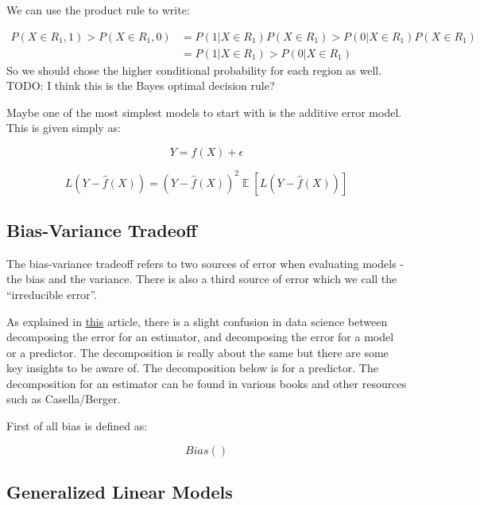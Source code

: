 \documentclass[paper=a4, fontsize=11pt]{scrartcl} %
\numberwithin{equation}{section} %
\numberwithin{figure}{section} %
\numberwithin{table}{section} %
\DeclareMathOperator{\EX}{\mathbb{E}}%
\begin{document}
 We can use the product rule to write:
 
 \begin{equation}
 \begin{split}
 P(X\in R_1, 1) >  P(X\in R_1, 0)  & =  P(1|X\in R_1) P(X \in R_1) > P(0|X\in R_1) P(X \in R_1) \\
 & =  P(1|X\in R_1) > P(0|X\in R_1) 
 \end{split}
 \end{equation}
 So we should chose the higher conditional probability for each region as well. TODO: I think this is the Bayes optimal decision rule?
 
 



Maybe one of the most simplest models to start with is the additive error model. This is given simply as:

\begin{equation}
Y = f(X) + \epsilon
\end{equation}


\begin{equation}
L(Y - \hat{f}(X)) = (Y - \hat{f}(X))^2
\EX[L(Y - \hat{f}(X))]
\end{equation}


\subsection{Bias-Variance Tradeoff}

The bias-variance tradeoff refers to two sources of error when evaluating models - the bias and the variance. There is also a third source of error which we call the ``irreducible error''. 

As explained in \href{https://towardsdatascience.com/mse-and-bias-variance-decomposition-77449dd2ff55}{this} article, there is a slight confusion in data science between decomposing the error for an \gls{estimator}, and decomposing the error for a model or a predictor. The decomposition is really about the same but there are some key insights to be aware of. The decomposition below is for a predictor. The decomposition for an estimator can be found in various books and other resources such as Casella/Berger. 

First of all bias is defined as:

\begin{equation}
Bias()
\end{equation}


\subsection{Generalized Linear Models}
\end{document}
